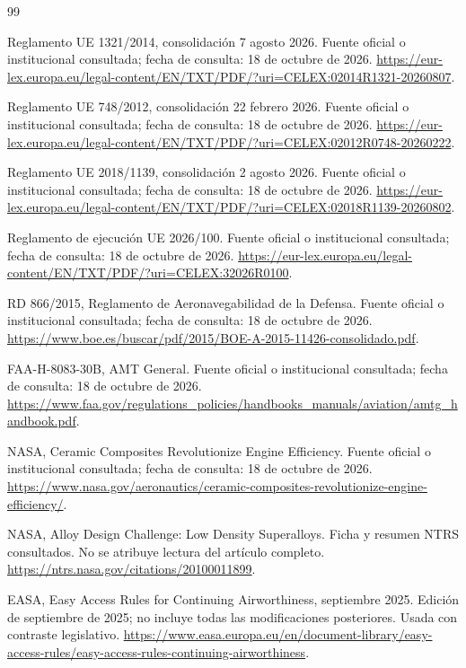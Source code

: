 \begin{thebibliography}{99}
 Reglamento UE 1321/2014, consolidación 7 agosto 2026. Fuente oficial o institucional consultada; fecha de consulta: 18 de octubre de 2026. \url{https://eur-lex.europa.eu/legal-content/EN/TXT/PDF/?uri=CELEX:02014R1321-20260807}.

 Reglamento UE 748/2012, consolidación 22 febrero 2026. Fuente oficial o institucional consultada; fecha de consulta: 18 de octubre de 2026. \url{https://eur-lex.europa.eu/legal-content/EN/TXT/PDF/?uri=CELEX:02012R0748-20260222}.

 Reglamento UE 2018/1139, consolidación 2 agosto 2026. Fuente oficial o institucional consultada; fecha de consulta: 18 de octubre de 2026. \url{https://eur-lex.europa.eu/legal-content/EN/TXT/PDF/?uri=CELEX:02018R1139-20260802}.

 Reglamento de ejecución UE 2026/100. Fuente oficial o institucional consultada; fecha de consulta: 18 de octubre de 2026. \url{https://eur-lex.europa.eu/legal-content/EN/TXT/PDF/?uri=CELEX:32026R0100}.

 RD 866/2015, Reglamento de Aeronavegabilidad de la Defensa. Fuente oficial o institucional consultada; fecha de consulta: 18 de octubre de 2026. \url{https://www.boe.es/buscar/pdf/2015/BOE-A-2015-11426-consolidado.pdf}.

 FAA-H-8083-30B, AMT General. Fuente oficial o institucional consultada; fecha de consulta: 18 de octubre de 2026. \url{https://www.faa.gov/regulations_policies/handbooks_manuals/aviation/amtg_handbook.pdf}.

 NASA, Ceramic Composites Revolutionize Engine Efficiency. Fuente oficial o institucional consultada; fecha de consulta: 18 de octubre de 2026. \url{https://www.nasa.gov/aeronautics/ceramic-composites-revolutionize-engine-efficiency/}.

 NASA, Alloy Design Challenge: Low Density Superalloys. Ficha y resumen NTRS consultados. No se atribuye lectura del artículo completo. \url{https://ntrs.nasa.gov/citations/20100011899}.

 EASA, Easy Access Rules for Continuing Airworthiness, septiembre 2025. Edición de septiembre de 2025; no incluye todas las modificaciones posteriores. Usada con contraste legislativo. \url{https://www.easa.europa.eu/en/document-library/easy-access-rules/easy-access-rules-continuing-airworthiness}.


\end{thebibliography}
